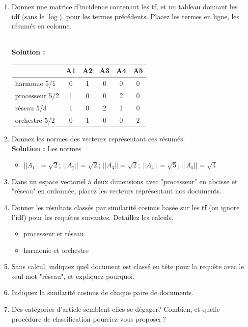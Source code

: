 \documentclass[11pt,a4paper]{article}
\newenvironment{solution}[0]{
~\\ \color{red} \textbf{Solution : }\color{black}}{%
}
\begin{document}
\begin{enumerate}
   \item Donnez une matrice d'incidence contenant les tf, 
      et un tableau donnant les idf (sans le $\log$), pour les  termes précédents. Placez
      les termes en ligne, les résumés en colonne.

\begin{solution}
\begin{center}
\begin{tabular}{l|c|c|c|c|c}
            & \textbf{A1} & \textbf{A2} & \textbf{A3} &\textbf{A4}&\textbf{A5} \\ \hline  
   harmonie 5/1   & 0           & 1           & 0          & 0         & 0\\
   processeur  5/2  & 1           & 0           & 0           & 2        & 0\\
   réseau  5/3  & 1           & 0           & 2          & 1         & 0\\
   orchestre 5/2  & 0           & 1           & 0           & 0        & 2\\\hline
   \end{tabular}
\end{center}
\end{solution}

  \item Donnez les normes des vecteurs représentant ces résumés.
\begin{solution}
Les normes
\begin{itemize}
  \item $||A_1|| = \sqrt{2}$; $||A_2|| = \sqrt{2}$; $||A_3|| = \sqrt{2}$; 
    $||A_4|| = \sqrt{5}$, $||A_5|| = \sqrt{4}$  
\end{itemize}
\end{solution}
  
  \item Dans un espace vectoriel à deux dimensions avec "processeur" en abcisse
  et "réseau" en ordonnée, placez les vecteurs représentant nos documents.
  
  \item Donner les résultats classés par similarité cosinus basée sur les tf 
  (on ignore l'idf) pour les requêtes suivantes. Detaillez les calculs.
  
  \begin{itemize}
    \item processeur et réseau
    \item harmonie et orchestre
  \end{itemize}
\item Sans calcul, indiquez quel document est classé en tête pour la requête 
    avec le seul mot "réseau", et expliquez pourquoi.
    
 \item Indiquez la similarité cosinus de chaque paire de documents.
 
 \item Des catégories d'article semblent-elles se dégager? Combien, et quelle
 procédure de classification pourriez-vous proposer\,?
\end{enumerate}
\end{document}
